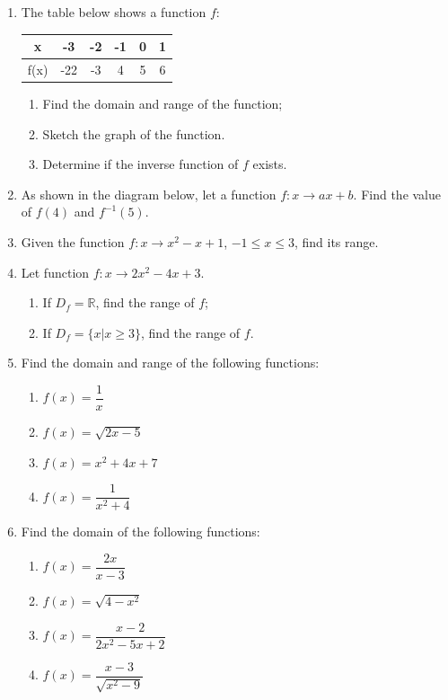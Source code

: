 \documentclass[12pt]{report}
\begin{document}
\begin{multicols}{2}
\begin{enumerate}
    \item The table below shows a function $f$:
          \begin{center}
            \begin{tabular}{|c|c|c|c|c|c|}
              \hline
              x    & -3  & -2 & -1 & 0 & 1 \\
              \hline
              f(x) & -22 & -3 & 4  & 5 & 6 \\
              \hline
            \end{tabular}
          \end{center}
          \begin{enumerate}
            \item Find the domain and range of the function;
            \item Sketch the graph of the function.
            \item Determine if the inverse function of $f$ exists.
          \end{enumerate}

    \item As shown in the diagram below, let a function $f: x \to ax + b$. Find the value
          of $f(4)$ and $f^{-1}(5)$.

    \item Given the function $f:x \to x^2 - x + 1$, $-1 \leq x \leq 3$, find its range.

    \item Let function $f:x \to 2x^2 - 4x + 3$.
          \begin{enumerate}
            \item If $D_f = \mathbb{R}$, find the range of $f$;
            \item If $D_f = \big\{x | x \geq 3\big\}$, find the range of $f$.
          \end{enumerate}

    \item Find the domain and range of the following functions:
          \begin{enumerate}
            \item $f(x) = \dfrac{1}{x}$
            \item $f(x) = \sqrt{2x - 5}$
            \item $f(x) = x^2 + 4x + 7$
            \item $f(x) = \dfrac{1}{x^2 + 4}$
          \end{enumerate}

    \item Find the domain of the following functions:
          \begin{enumerate}
            \item $f(x) = \dfrac{2x}{x-3}$
            \item $f(x) = \sqrt{4 - x^2}$
            \item $f(x) = \dfrac{x-2}{2x^2 - 5x + 2}$
            \item $f(x) = \dfrac{x-3}{\sqrt{x^2 - 9}}$
          \end{enumerate}


\end{enumerate}
\end{multicols}
\end{document}
